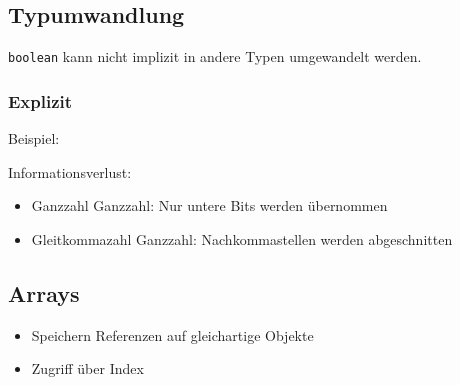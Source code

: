 \subsection{Typumwandlung}
\begin{minipage}{0.6\columnwidth}
\end{minipage}
\begin{minipage}{0.35\columnwidth}
    \lstinline{boolean} kann nicht implizit in andere Typen umgewandelt werden.
\end{minipage}


\begin{minipage}[t]{0.22\columnwidth}
    \subsubsection{Explizit}
    \raggedright%
    Beispiel: 
    
\end{minipage}\hfill%
\begin{minipage}[t]{0.77\columnwidth}
    \raggedright%
    \vspace{0.2ex}
    Informationsverlust:
    \begin{itemize}
        \item Ganzzahl \textrightarrow{} Ganzzahl: Nur untere Bits werden übernommen
        \item Gleitkommazahl \textrightarrow{} Ganzzahl: Nachkommastellen werden abgeschnitten
    \end{itemize}
\end{minipage}

\subsection{Arrays}
\begin{itemize}
    \item Speichern Referenzen auf gleichartige Objekte
    \item Zugriff über Index
\end{itemize}

